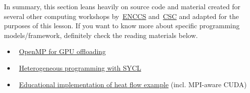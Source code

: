 


\par
In summary, this section leans heavily on source code and material created for several other computing workshops by~\href{https://enccs.se/}{ENCCS} and~\href{https://www.csc.fi/en/home}{CSC} and adapted for the purposes of this lesson.
If you want to know more about specific programming models/framework, definitely check the reading materials below.
\begin{itemize}
    \item~\href{https://enccs.github.io/openmp-gpu/}{OpenMP for GPU offloading}
    \item~\href{https://enccs.github.io/sycl-workshop/}{Heterogeneous programming with SYCL}
    \item~\href{https://github.com/cschpc/heat-equation/}{Educational implementation of heat flow example} (incl. MPI-aware CUDA)
\end{itemize}
